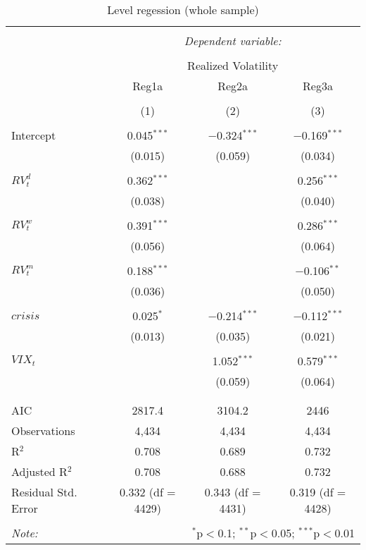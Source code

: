 
\begin{table}[!htbp] \centering 
  \caption{Level regession (whole sample)} 
  \label{tab:newey1} 
\begin{tabular}{@{\extracolsep{5pt}}lccc} 
\\[-1.8ex]\hline 
\hline \\[-1.8ex] 
 & \multicolumn{3}{c}{\textit{Dependent variable:}} \\ 
\cline{2-4} 
\\[-1.8ex] & \multicolumn{3}{c}{Realized Volatility} \\ 
 & Reg1a & Reg2a & Reg3a \\ 
\\[-1.8ex] & (1) & (2) & (3)\\ 
\hline \\[-1.8ex] 
 Intercept & 0.045$^{***}$ & $-$0.324$^{***}$ & $-$0.169$^{***}$ \\ 
  & (0.015) & (0.059) & (0.034) \\ 
  & & & \\ 
 $RV^{d}_{t}$ & 0.362$^{***}$ &  & 0.256$^{***}$ \\ 
  & (0.038) &  & (0.040) \\ 
  & & & \\ 
 $RV^{w}_{t}$ & 0.391$^{***}$ &  & 0.286$^{***}$ \\ 
  & (0.056) &  & (0.064) \\ 
  & & & \\ 
 $RV^{m}_{t}$ & 0.188$^{***}$ &  & $-$0.106$^{**}$ \\ 
  & (0.036) &  & (0.050) \\ 
  & & & \\ 
 $crisis$ & 0.025$^{*}$ & $-$0.214$^{***}$ & $-$0.112$^{***}$ \\ 
  & (0.013) & (0.035) & (0.021) \\ 
  & & & \\ 
 $VIX_{t}$ &  & 1.052$^{***}$ & 0.579$^{***}$ \\ 
  &  & (0.059) & (0.064) \\ 
  & & & \\ 
\hline \\[-1.8ex] 
AIC & 2817.4 & 3104.2 & 2446 \\ 
Observations & 4,434 & 4,434 & 4,434 \\ 
R$^{2}$ & 0.708 & 0.689 & 0.732 \\ 
Adjusted R$^{2}$ & 0.708 & 0.688 & 0.732 \\ 
Residual Std. Error & 0.332 (df = 4429) & 0.343 (df = 4431) & 0.319 (df = 4428) \\ 
\hline 
\hline \\[-1.8ex] 
\textit{Note:}  & \multicolumn{3}{r}{$^{*}$p$<$0.1; $^{**}$p$<$0.05; $^{***}$p$<$0.01} \\ 
\end{tabular} 
\end{table} 
